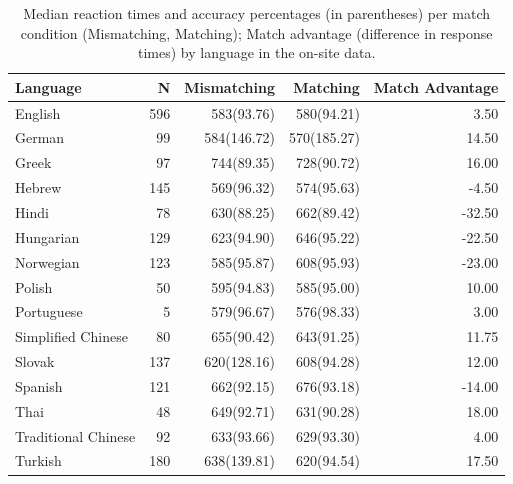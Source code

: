 \documentclass[
  man]{apa6}
\begin{document}
\begin{table}

\caption{\label{tab:summary-site}Median reaction times and accuracy percentages (in parentheses) per match condition (Mismatching, Matching); Match advantage (difference in response times) by language in the on-site data.}
\centering
\begin{tabular}[t]{lrrrr}
\toprule
Language & N & Mismatching & Matching & Match Advantage\\
\midrule
English & 596 & 583(93.76) & 580(94.21) & 3.50\\
German & 99 & 584(146.72) & 570(185.27) & 14.50\\
Greek & 97 & 744(89.35) & 728(90.72) & 16.00\\
Hebrew & 145 & 569(96.32) & 574(95.63) & -4.50\\
Hindi & 78 & 630(88.25) & 662(89.42) & -32.50\\
\addlinespace
Hungarian & 129 & 623(94.90) & 646(95.22) & -22.50\\
Norwegian & 123 & 585(95.87) & 608(95.93) & -23.00\\
Polish & 50 & 595(94.83) & 585(95.00) & 10.00\\
Portuguese & 5 & 579(96.67) & 576(98.33) & 3.00\\
Simplified Chinese & 80 & 655(90.42) & 643(91.25) & 11.75\\
\addlinespace
Slovak & 137 & 620(128.16) & 608(94.28) & 12.00\\
Spanish & 121 & 662(92.15) & 676(93.18) & -14.00\\
Thai & 48 & 649(92.71) & 631(90.28) & 18.00\\
Traditional Chinese & 92 & 633(93.66) & 629(93.30) & 4.00\\
Turkish & 180 & 638(139.81) & 620(94.54) & 17.50\\
\bottomrule
\end{tabular}
\end{table}
\end{document}
